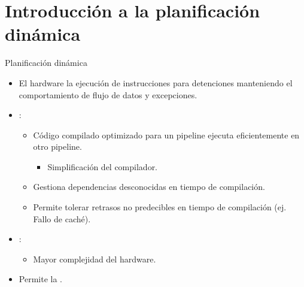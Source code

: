 \section{Introducción a la planificación dinámica}
\begin{frame}[t]{Planificación dinámica}
\begin{itemize}
  \item El hardware  la ejecución de instrucciones para
         detenciones manteniendo el comportamiento de flujo de
        datos y excepciones.

  \item {}:
    \begin{itemize}
      \item Código compilado optimizado para un pipeline ejecuta eficientemente 
            en otro pipeline.
        \begin{itemize}
          \item Simplificación del compilador.
        \end{itemize}
      \item Gestiona dependencias desconocidas en tiempo de compilación.
      \item Permite tolerar retrasos no predecibles en tiempo de compilación
            (ej. Fallo de caché).
    \end{itemize}

  \item {}:
    \begin{itemize}
      \item Mayor complejidad del hardware.
    \end{itemize}

  \item Permite la .

\end{itemize}
\end{frame}



